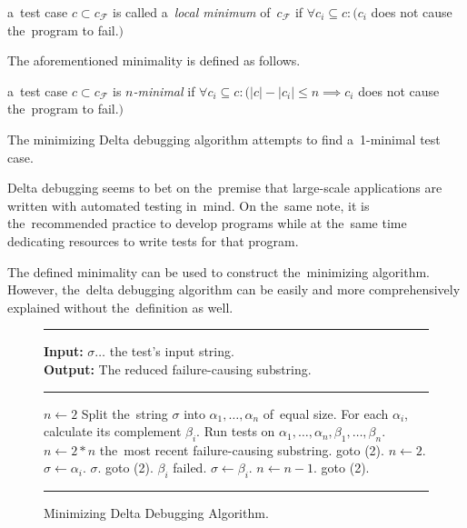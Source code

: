 \begin{defn}\label{def02:3}
  a~test case $c \subset c_\mathcal{F}$ is called a~\emph{local minimum}
  of~$c_\mathcal{F}$ if $\forall c_i \subseteq c:
  (c_i$ does not cause the~program to fail.$)$
\end{defn}

The aforementioned minimality is defined as follows.

\begin{defn}[$n$-minimality]\label{def02:4}
  a~test case $c \subset c_\mathcal{F}$ is \emph{$n$-minimal}
  if $\forall c_i \subseteq c:
  (|c| - |c_i| \leq n \implies c_i$ does not cause the~program to fail.$)$
\end{defn}

The minimizing Delta debugging algorithm attempts to find a~1-minimal test case.

Delta debugging seems to bet on the~premise that large-scale applications are written
with automated testing in~mind. On the~same note, it is the~recommended practice to
develop programs while at the~same time dedicating resources to write tests for that
program.

The defined minimality can be used to construct the~minimizing algorithm. 
However, the~delta debugging algorithm can be easily and more comprehensively explained 
without the~definition as well.


\begin{figure}[h]
	\hrule height.8pt depth0pt \kern2pt
	\textbf{Input:} $\sigma \ldots$ the test's input string. \\
	\textbf{Output:} The reduced failure-causing substring. 
	\hrule height.8pt depth0pt \kern2pt
	\begin{algorithmic}[1]
		\State $n \leftarrow 2$
		\State Split the~string $\sigma$ into $\alpha_1,\dots,\alpha_n$ of~equal size.
		\State For each $\alpha_i$, calculate its complement $\beta_i$.
		\State Run tests on $\alpha_1,\dots,\alpha_n,\beta_1,\dots,\beta_n$.
			\State $n \leftarrow 2*n$
				\Return the~most recent failure-causing substring.
			\Else
				\State goto (2).
			\EndIf
			\State $n \leftarrow 2$.
			\State $\sigma \leftarrow \alpha_i$.
				\Return $\sigma$.
			\Else
				\State goto (2).
			\EndIf
		\Else
			\Comment $\beta_i$ failed.
			\State $\sigma \leftarrow \beta_i$.
			\State $n \leftarrow n - 1$.
			\State goto (2).
		\EndIf
	\end{algorithmic} 
	\hrule height.8pt depth0pt \kern2pt
	\caption{Minimizing Delta Debugging Algorithm.} 
	\label{alg:dd}
\end{figure}

